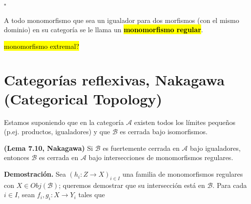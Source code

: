\documentclass[10pt]{article}
\newcommand{\hlgray}[1]{{\sethlcolor{Ivory2}\hl{#1}}}
\newcommand*{\QEDB}{\null\nobreak\hfill\ensuremath{\square}}%
\newtheorem[M]{teo}{Teorema}[section]
\newtheorem[M]{listaObj}[teo]{Lista de deseos}
\newtheorem[M]{preg}[teo]{Pregunta}
\newtheorem[M]{lema}[teo]{Lema}
\newtheorem[M]{hip}[teo]{Hipótesis}
\newtheorem[M]{prop}[teo]{Proposición}
\newtheorem[M]{obs}[teo]{Observación}
\newtheorem[M]{cor}[teo]{Corolario}
\newtheorem[M]{notacion}[teo]{Notación}
\newtheorem[M]{nota}[teo]{Nota}
\begin{document}
\begin{center}
\end{center}

\QEDB
\vspace{0.2cm}

\begin{defi}
A todo monomorfismo que sea un igualador para dos morfismos
(con el mismo dominio) en
su categoría se le llama un \textbf{\hlgray{monomorfismo regular}}.
\end{defi}


\hl{monomorfismo extremal?}

\section{Categorías reflexivas, Nakagawa (Categorical Topology)}

Estamos suponiendo que en la categoría $\mathcal{A}$ existen todos los 
límites pequeños (p.ej. productos, igualadores) y que $\mathcal{B}$
es cerrada bajo isomorfismos.

\begin{lema}
\textbf{(Lema 7.10, Nakagawa)} Si $\mathcal{B}$ es fuertemente cerrada en 
$\mathcal{A}$ bajo igualadores, entonces $\mathcal{B}$ es cerrada en 
$\mathcal{A}$ bajo intersecciones de monomorfismos regulares.

\end{lema}
\textbf{Demostración.}
Sea $(h_{i}: Z \longrightarrow X)_{i \in I}$ una familia de monomorfismos
regulares con $X \in Obj(\mathcal{B})$; queremos demostrar que su intersección
está en $\mathcal{B}$. Para cada $i \in I$, sean 
$f_{i}, g_{i}: X \longrightarrow Y_{i}$ tales que 
\end{document}
